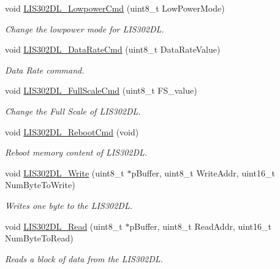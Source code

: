 \begin{DoxyCompactItemize}
void \hyperlink{group___s_t_m32_f4___d_i_s_c_o_v_e_r_y___l_i_s302_d_l___private___functions_ga445e78cca4cd65f59e0ffaa3575db8ae}{L\-I\-S302\-D\-L\-\_\-\-Lowpower\-Cmd} (uint8\-\_\-t Low\-Power\-Mode)
\begin{DoxyCompactList}\small\item\em Change the lowpower mode for L\-I\-S302\-D\-L. \end{DoxyCompactList}\item 
void \hyperlink{group___s_t_m32_f4___d_i_s_c_o_v_e_r_y___l_i_s302_d_l___private___functions_ga8542910cb1e71d7031fab7a462c768bd}{L\-I\-S302\-D\-L\-\_\-\-Data\-Rate\-Cmd} (uint8\-\_\-t Data\-Rate\-Value)
\begin{DoxyCompactList}\small\item\em Data Rate command. \end{DoxyCompactList}\item 
void \hyperlink{group___s_t_m32_f4___d_i_s_c_o_v_e_r_y___l_i_s302_d_l___private___functions_gadb44926aefe4fc8e6cdff256077c0bf4}{L\-I\-S302\-D\-L\-\_\-\-Full\-Scale\-Cmd} (uint8\-\_\-t F\-S\-\_\-value)
\begin{DoxyCompactList}\small\item\em Change the Full Scale of L\-I\-S302\-D\-L. \end{DoxyCompactList}\item 
void \hyperlink{group___s_t_m32_f4___d_i_s_c_o_v_e_r_y___l_i_s302_d_l___private___functions_ga34234db89f7d653fea3085007d3d9e0e}{L\-I\-S302\-D\-L\-\_\-\-Reboot\-Cmd} (void)
\begin{DoxyCompactList}\small\item\em Reboot memory content of L\-I\-S302\-D\-L. \end{DoxyCompactList}\item 
void \hyperlink{group___s_t_m32_f4___d_i_s_c_o_v_e_r_y___l_i_s302_d_l___private___functions_ga43f400565c47cdcf5fd19b8b601e7c41}{L\-I\-S302\-D\-L\-\_\-\-Write} (uint8\-\_\-t $\ast$p\-Buffer, uint8\-\_\-t Write\-Addr, uint16\-\_\-t Num\-Byte\-To\-Write)
\begin{DoxyCompactList}\small\item\em Writes one byte to the L\-I\-S302\-D\-L. \end{DoxyCompactList}\item 
void \hyperlink{group___s_t_m32_f4___d_i_s_c_o_v_e_r_y___l_i_s302_d_l___private___functions_gae578a971afc1699d6056937ad7604d0a}{L\-I\-S302\-D\-L\-\_\-\-Read} (uint8\-\_\-t $\ast$p\-Buffer, uint8\-\_\-t Read\-Addr, uint16\-\_\-t Num\-Byte\-To\-Read)
\begin{DoxyCompactList}\small\item\em Reads a block of data from the L\-I\-S302\-D\-L. \end{DoxyCompactList}\item 

\end{DoxyCompactItemize}
